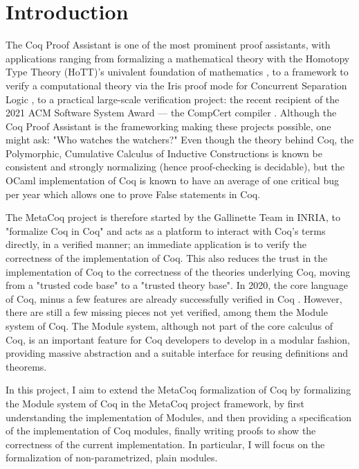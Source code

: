 \chapter{Introduction}

The Coq Proof Assistant is one of the most prominent proof assistants, with
applications ranging from formalizing a mathematical theory with the Homotopy
Type Theory (HoTT)'s univalent foundation of mathematics
, to a framework to verify a
computational theory via the Iris proof mode for Concurrent Separation Logic
, to a practical large-scale verification project: the
recent recipient of the 2021 ACM Software System Award --- the CompCert
compiler . Although the
Coq Proof Assistant is the frameworking making these projects possible, one
might ask: "Who watches the watchers?"  Even though the theory behind Coq, the Polymorphic,
Cumulative Calculus of Inductive Constructions is known be consistent and
strongly normalizing (hence proof-checking is decidable), but the OCaml
implementation of Coq is known to have an average of one critical bug per year
which allows one to prove False statements in Coq.

The MetaCoq project  is therefore
started by the Gallinette Team in INRIA, to "formalize Coq in Coq" and acts as a
platform to interact with Coq's terms directly, in a verified manner; an
immediate application is to verify the correctness of the implementation of Coq.
This also reduces the trust in the implementation of Coq to the correctness of
the theories underlying Coq, moving from a "trusted code base" to a "trusted
theory base". In 2020, the core language of Coq, minus a few features are
already successfully verified in Coq . However, there
are still a few missing pieces not yet verified, among them the Module system of
Coq. The Module system, although not part of the core calculus of Coq, is an
important feature for Coq developers to develop in a modular fashion, providing
massive abstraction and a suitable interface for reusing definitions and
theorems.

In this project, I aim to extend the MetaCoq formalization of Coq by formalizing
the Module system of Coq in the MetaCoq project framework, by first
understanding the implementation of Modules, and then providing a specification
of the implementation of Coq modules, finally writing proofs to show the
correctness of the current implementation.  In particular, I will focus on the
formalization of non-parametrized, plain modules.

